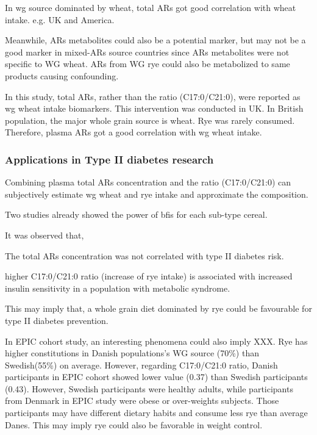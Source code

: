 In \acrfull{wg} source dominated by wheat, total ARs got good correlation with wheat intake. e.g. UK and America. 

Meanwhile, ARs metabolites could also be a potential marker, but may not be a good marker in mixed-ARs source countries since ARs metabolites were not specific to WG wheat. 
ARs from WG rye could also be metabolized to same products causing confounding.

In this study\cite{ISI:000298402100026}, total ARs, rather than the ratio (C17:0/C21:0), were reported as \acrshort{wg} wheat intake biomarkers.
This intervention was conducted in UK. In British population, the major whole grain source is wheat. Rye was rarely consumed. Therefore, plasma ARs got a good correlation with \acrfull{wg} wheat intake.

\subsubsection{Applications in Type II diabetes research}

Combining plasma total ARs concentration and the ratio (C17:0/C21:0) can subjectively estimate \acrshort{wg} wheat and rye intake and approximate the composition.

Two studies already showed the power of \acrshort{bfis} for each sub-type cereal. 

It was observed that, 

The total ARs concentration was not correlated with type II diabetes risk.

higher C17:0/C21:0 ratio (increase of rye intake) is associated with increased insulin sensitivity in a population with metabolic syndrome.

This may imply that, a whole grain diet dominated by rye could be favourable for type II diabetes prevention. 

In EPIC cohort study, an interesting phenomena could also imply XXX. Rye has higher constitutions in Danish populations's WG source (70\%) than Swedish(55\%) on average. However, regarding C17:0/C21:0 ratio, Danish participants in EPIC cohort showed lower value (0.37) than Swedish participants (0.43). 
However, Swedish participants were healthy adults, while participants from Denmark in EPIC study were obese or over-weights subjects. Those participants may have different dietary habits and consume less rye than average Danes. This may imply rye could also be favorable in weight control. 


